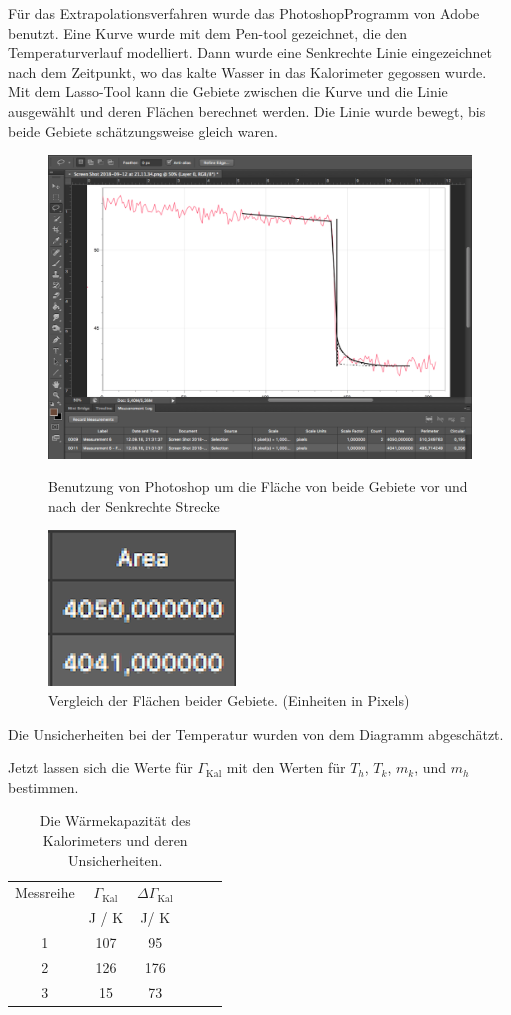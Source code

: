 \documentclass[11pt,a4paper]{article} %
\begin{document}
Für das Extrapolationsverfahren wurde das Photoshop\textregistered Programm von Adobe   benutzt. Eine Kurve wurde mit dem Pen-tool gezeichnet, die den Temperaturverlauf modelliert. Dann wurde eine Senkrechte Linie eingezeichnet nach dem Zeitpunkt, wo das kalte Wasser in das Kalorimeter gegossen wurde. Mit dem Lasso-Tool kann die Gebiete zwischen die Kurve und die Linie ausgewählt und deren Flächen berechnet werden. Die Linie wurde bewegt, bis beide Gebiete schätzungsweise gleich waren. 
\begin{figure}[h]
\centering
\includegraphics[width=\linewidth]{Abb1}
\caption{Benutzung von Photoshop um die Fläche von beide Gebiete vor und nach der Senkrechte Strecke}

\includegraphics{Abb2}
\caption{Vergleich der Flächen beider Gebiete. (Einheiten in Pixels)}
\end{figure}
\FloatBarrier
Die Unsicherheiten bei der Temperatur wurden von dem Diagramm abgeschätzt. 
	
Jetzt lassen sich die Werte für $\Gamma_\textrm{Kal}$ mit den Werten für $T_h$, $T_k$, $m_k$, und $m_h$ bestimmen. 

\begin{table}[h]
	\centering
	\begin{tabular*}{0.99\textwidth}{@{\extracolsep{\fill}}cccccc}
		\toprule
		Messreihe & $\Gamma_\textrm{Kal}$ & $\Delta \Gamma_\textrm{Kal}$  \\
		& J / K & J/ K\\
		1 & 107 & 95  \\
		2 & 126 & 176 \\
		3 & 15 & 73 \\
		\bottomrule
	\end{tabular*}
	\caption{Die Wärmekapazität des Kalorimeters und deren Unsicherheiten.}
	\label{tabelle3}
\end{table}
\end{document}
